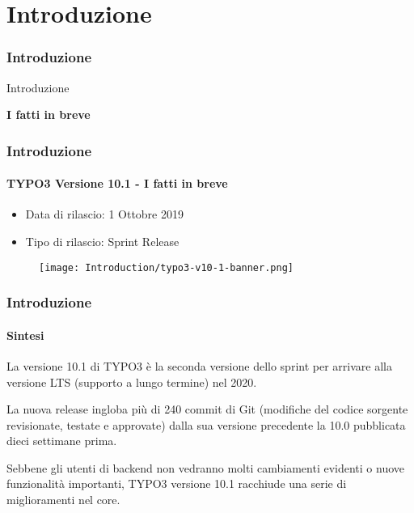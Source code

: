 %

\section{Introduzione}
\begin{frame}[fragile]
	\frametitle{Introduzione}

	\begin{center}\huge{Introduzione}\end{center}
	\begin{center}\huge{\color{typo3darkgrey}\textbf{I fatti in breve}}\end{center}

\end{frame}


\begin{frame}[fragile]
	\frametitle{Introduzione}
	\framesubtitle{TYPO3 Versione 10.1 - I fatti in breve}

	\begin{itemize}
		\item Data di rilascio: 1 Ottobre 2019
		\item Tipo di rilascio: Sprint Release
	\end{itemize}

	\begin{figure}
		\texttt{[image: Introduction/typo3-v10-1-banner.png]}
	\end{figure}

\end{frame}


\begin{frame}[fragile]
	\frametitle{Introduzione}
	\framesubtitle{Sintesi}

	\small
		La versione 10.1 di TYPO3 è la seconda versione dello sprint per arrivare alla versione LTS
		(supporto a lungo termine) nel 2020.

		\vspace{0.2cm}

		La nuova release ingloba più di 240 commit di Git (modifiche del codice sorgente revisionate, testate e
		approvate) dalla sua versione precedente la 10.0 pubblicata dieci settimane prima.

		\vspace{0.2cm}

		Sebbene gli utenti di backend non vedranno molti cambiamenti evidenti o nuove funzionalità importanti,
		TYPO3 versione 10.1 racchiude una serie di miglioramenti nel core.

	\normalsize

\end{frame}


